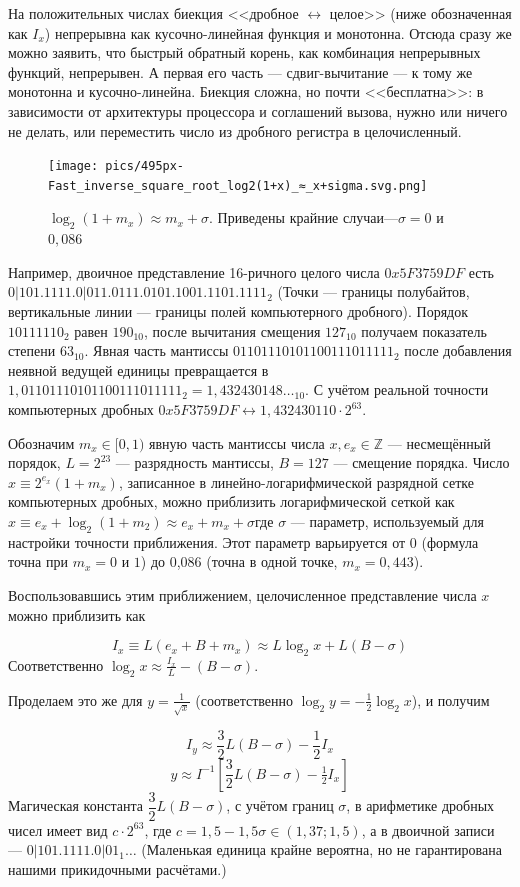 \documentclass{book}
\begin{document}
 На положительных числах биекция <<дробное $\leftrightarrow$ целое>> (ниже обозначенная как $I_{x}$) непрерывна как кусочно-линейная функция и монотонна. Отсюда сразу же можно заявить, что быстрый обратный корень, как комбинация непрерывных функций, непрерывен. А первая его часть --- сдвиг-вычитание — к тому же монотонна и кусочно-линейна. Биекция сложна, но почти <<бесплатна>>: в зависимости от архитектуры процессора и соглашений вызова, нужно или ничего не делать, или переместить число из дробного регистра в целочисленный.
  \begin{figure}
    \centering
    \texttt{[image: pics/495px-Fast\_inverse\_square\_root\_log2(1+x)\_≈\_x+sigma.svg.png]}
    \caption{$\log_{2}(1+m_{x})\approx m_{x}+\sigma$. Приведены крайние случаи---$\sigma=0$ и $0,086$}
\end{figure}
 Например, двоичное представление 16-ричного целого числа $0x5F3759DF$ есть $0|101.1111.0|011.0111.0101.1001.1101.1111_{2}$ (Точки — границы полубайтов, вертикальные линии — границы полей компьютерного дробного). Порядок $101 1111 0_{2}$ равен $190_{10}$, после вычитания смещения $127_{10}$ получаем показатель степени $63_{10}$. Явная часть мантиссы $01 101 110 101 100 111 011 111_{2}$ после добавления неявной ведущей единицы превращается в $1,011 011 101 011 001 110 111 11_{2} = 1,432 430 148\ldots_{10}$. С учётом реальной точности компьютерных дробных $0x5F3759DF \leftrightarrow 1,432430110·2^{63}.$
 
 Обозначим $m_{x}\in [0,1)$ явную часть мантиссы числа $x, e_{x}\in \mathbb {Z}$ --- несмещённый порядок, $L=2^{23}$ — разрядность мантиссы, $ B=127$ --- смещение порядка. Число $x\equiv 2^{e_{x}}(1+m_{x})$, записанное в линейно-логарифмической разрядной сетке компьютерных дробных, можно приблизить логарифмической сеткой как $x\equiv e_{x}+\log_{2}(1+m_{2})\approx e_{x}+m_{x}+\sigma $где $\sigma$  --- параметр, используемый для настройки точности приближения. Этот параметр варьируется от 0 (формула точна при $m_{x}=0$ и $1$) до 0,086 (точна в одной точке, $m_{x}=0{,}443$).

Воспользовавшись этим приближением, целочисленное представление числа $x$ можно приблизить как


$$ I_{x}\equiv L(e_{x}+B+m_{x})\approx L\log _{2}x+L(B-\sigma )$$
Соответственно ${\log _{2}x\approx {\frac {I_{x}}{L}}-(B-\sigma )}$.

Проделаем это же для $y=\tfrac {1}{\sqrt {x}}$ (соответственно $\log _{2}y=-{\tfrac {1}{2}}\log _{2}x$), и получим

$$I_{y}\approx {\dfrac {3}{2}}L(B-\sigma )-{\dfrac {1}{2}}I_{x}$$
$$y\approx I^{-1}\left[{\dfrac {3}{2}}L(B-\sigma )-{\tfrac {1}{2}}I_{x}\right]$$
Магическая константа $\dfrac{3}{2}L(B-\sigma)$, с учётом границ $\sigma$, в арифметике дробных чисел имеет вид $c\cdot 2^{63}$, где $ c=1,5-1,5\sigma \in (1,37;1,5)$, а в двоичной записи --- $0|101.1111.0|01_{1}\ldots$ (Маленькая единица крайне вероятна, но не гарантирована нашими прикидочными расчётами.)
\end{document}
